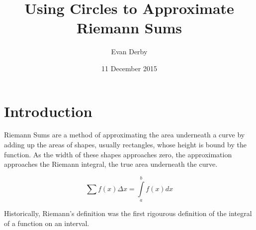 \documentclass{article}
\begin{document}
  \title{Using Circles to Approximate Riemann Sums}
  \author{Evan Derby}
  \date{11 December 2015}
  \maketitle

  \section{Introduction}
    Riemann Sums are a method of approximating the area underneath a curve by
    adding up the areas of shapes, usually rectangles, whose height is bound by
    the function. As the width of these shapes approaches zero, the
    approximation approaches the Riemann integral, the true area underneath the
    curve.

    \[ \displaystyle\sum f(x) \Delta x = \int\limits_a^b f(x)dx \]


    Historically, Riemann's definition was the first rigourous definition of the
    integral of a function on an interval.
\end{document}
